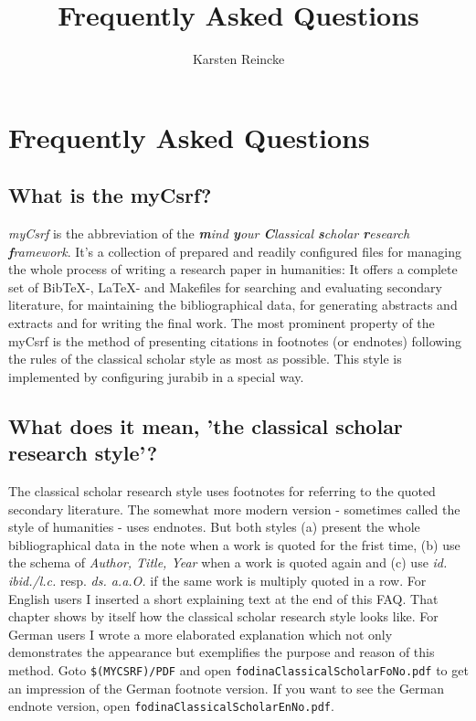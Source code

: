 \documentclass[
  DIV=calc,
  BCOR=5mm,
  11pt,
  headings=small,
  oneside,
  abstract=true,
  toc=bib,
  ngerman,english]{scrartcl}
\begin{document}
\nocite{*}

\titlehead{myCsrf-: the Classical Scholar Research
Framework} \subject{Humanities Made With \textit{LaTeX}, \textit{BibTeX} and
\textit{jurabib}}
\title{Frequently Asked Questions}
\author{Karsten Reincke}

\maketitle

\footnotesize
\tableofcontents

\normalsize

\section{Frequently Asked Questions }
\subsection{What is the myCsrf?}
\emph{myCsrf} is the abbreviation of the \textit{\textbf{m}ind \textbf{y}our
\textbf{C}lassical \textbf{s}cholar \textbf{r}esearch \textbf{f}rame\-work}. It's
a collection of prepared and readily configured files for managing the whole
process of writing a research paper in humanities: It offers a complete set of
BibTeX-, LaTeX- and Makefiles for searching and evaluating secondary literature,
for maintaining the bibliographical data, for generating abstracts and extracts
and for writing the final work. The most prominent property of the
myCsrf is the method of presenting citations in footnotes (or
endnotes) following the rules of the classical scholar style as most as
possible. This style is implemented by configuring jurabib in a special way.

\subsection{What does it mean, 'the classical scholar research style'?}
The classical scholar research style uses footnotes for referring to the quoted
secondary literature. The somewhat more modern version - sometimes called the
style of humanities - uses endnotes. But both styles (a) present the whole
bibliographical data in the note when a work is quoted for the frist time, (b)
use the schema of \textit{Author, Title, Year} when a work is quoted again and
(c) use \textit{id. ibid./l.c.} resp. \textit{ds. a.a.O.} if the same work is
multiply quoted in a row. For English users I inserted a short explaining text
at the end of this FAQ. That chapter shows by itself how the classical scholar
research style looks like. For German users I wrote a more elaborated
explanation which not only demonstrates the appearance but exemplifies the
purpose and reason of this method. Goto \texttt{\$(MYCSRF)/PDF}
and open \texttt{fodinaClassicalScholarFoNo.pdf} to get an impression of the
German footnote version. If you want to see the German endnote version, open
\texttt{fodinaClassicalScholarEnNo.pdf}.
\end{document}
